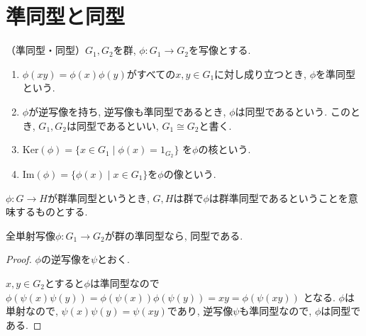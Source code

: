 \section*{準同型と同型}

\begin{dfn*}
	（準同型・同型）$G_1,G_2$を群, $\phi: G_1 \rightarrow G_2 $を写像とする.
	\begin{enumerate}
		\item $\phi(xy) = \phi(x)\phi(y)$がすべての$x,y \in G_1$に対し成り立つとき, 
		$\phi$を準同型という.
		\item $\phi$が逆写像を持ち, 逆写像も準同型であるとき, $\phi$は同型であるという.
		このとき, $G_1,G_2$は同型であるといい, $G_1 \cong G_2$と書く.
		\item $\mathrm{Ker}(\phi)=\{ x \in G_1 \mid \phi(x)=1_{G_2}\}$
		を$\phi$の核という.
		\item $\mathrm{Im}(\phi) = \{ \phi(x) \mid x \in G_1 \} $を$\phi$の像という.
	\end{enumerate}
\end{dfn*}
$\phi:G\rightarrow H$が群準同型というとき,
$G,H$は群で$\phi$は群準同型であるということを意味するものとする.\newline

\begin{tcolorbox}
	\begin{prp*}
		全単射写像$\phi: G_1 \to G_2$が群の準同型なら, 同型である.
	\end{prp*}
\end{tcolorbox}
\begin{proof}
	$\phi$の逆写像を$\psi$とおく. 
	
	$x,y \in G_2$とすると$\phi$は準同型なので
	$\phi(\psi(x)\psi(y))=\phi(\psi(x))\phi(\psi(y))=xy=\phi(\psi(xy))$
	となる. $\phi$は単射なので, $\psi(x)\psi(y)=\psi(xy)$であり, 
	逆写像$\psi$も準同型なので, $\phi$は同型である.
\end{proof}

